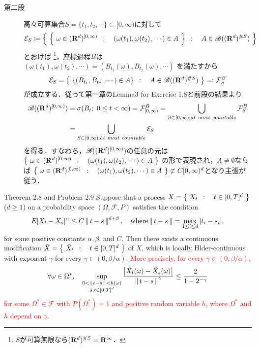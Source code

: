 \begin{prf}
\begin{description}
			\item[第二段]
				高々可算集合$S = \{t_1,t_2,\cdots\} \subset [0,\infty)$に対して
				\begin{align}
					\mathcal{E}_S \coloneqq \left\{\ \left\{\ \omega \in (\mathbf{R}^d)^{[0,\infty)}\ \, : \quad (\omega(t_1),\omega(t_2),\cdots) \in A\ \right\}\ \, : \quad A \in \mathscr{B}((\mathbf{R}^d)^{\# S})\ \right\}
				\end{align}
				とおけば
				\footnote{
					$S$が可算無限なら$(\mathbf{R}^d)^{\# S} = \mathbf{R}^\infty$．
				}，座標過程$B$は
				$(\omega(t_1),\omega(t_2),\cdots) = (B_{t_1}(\omega),B_{t_2}(\omega),\cdots)$
				を満たすから
				\begin{align}
					\mathcal{E}_S = \left\{\ \left\{(B_{t_1},B_{t_2},\cdots) \in A\right\}\ \, : \quad A \in \mathscr{B}((\mathbf{R}^d)^{\# S})\ \right\} =\mathrel{\mathop:} \mathcal{F}^B_S
				\end{align}
				が成立する．従って第一章のLemma3 for Exercise 1.8と前段の結果より
				\begin{align}
					\borel{(\R^d)^{[0,\infty)}}
					&= \sigma(B_t;\ 0 \leq t < \infty)
					= \mathcal{F}^B_{[0,\infty)}
					= \bigcup_{S \subset [0,\infty):at\ most\ countable} \mathcal{F}^B_S\\
					&= \bigcup_{S \subset [0,\infty):at\ most\ countable} \mathcal{E}_S
				\end{align}
				を得る．すなわち，$\mathscr{B}((\mathbf{R}^d)^{[0,\infty)})$の任意の元は
				$\left\{\ \omega \in (\mathbf{R}^d)^{[0,\infty)}\ \, : \quad (\omega(t_1),\omega(t_2),\cdots) \in A\ \right\}$
				の形で表現され，$A \neq \emptyset$ならば
				$\left\{\ \omega \in (\mathbf{R}^d)^{[0,\infty)}\ \, : \quad (\omega(t_1),\omega(t_2),\cdots) \in A\ \right\} \not\subset C[0,\infty)^d$となり主張が従う．
				\QED
		\end{description}
	\end{prf}
	
	\begin{itembox}[l]{Theorem 2.8 and Problem 2.9}
		Suppose that a process $X = \left\{\ X_t\ \, : \quad t \in  [0,T]^d\ \right\}$ ($d \geq 1$)
		on a probability space $(\Omega,\mathscr{F},P)$ satisfies the condition
		\begin{align}
			E|X_t - X_s|^\alpha \leq C\left\|\, t-s\, \right\|_{}^{d + \beta},
			\quad \mbox{where} \left\|\, t-s\, \right\|_{} = \operatorname*{max}_{1 \leq i \leq d}|t_i - s_i|,
		\end{align}
		for some positive constants $\alpha,\beta$, and $C$. Then there exists a 
		continuous modification $\tilde{X} = \left\{\ \tilde{X}_t\ \, : \quad t \in [0,T]^d\ \right\}$ of $X$, 
		which is locally Hlder-continuous with exponent $\gamma$ for every 
		$\gamma \in (0,\beta/\alpha)$. \textcolor{red}{More precisely, for every $\gamma \in (0,\beta/\alpha)$,
		\begin{align}
			\forall \omega \in \Omega^*, \quad \operatorname*{sup}_{\substack{0 < \left\|\, t-s\, \right\|_{} < h(\omega) \\ s,t \in [0,T]^d}} \frac{\left| \tilde{X}_t(\omega) - \tilde{X}_s(\omega) \right|}{\left\|\, t-s\, \right\|_{}^\gamma} \leq \frac{2}{1-2^{-\gamma}}
		\end{align}
		for some $\Omega^* \in \mathscr{F}$ with $P(\Omega^*)=1$ and 
		positive random variable $h$, where $\Omega^*$ and $h$ depend on $\gamma$.}
	\end{itembox}
	
